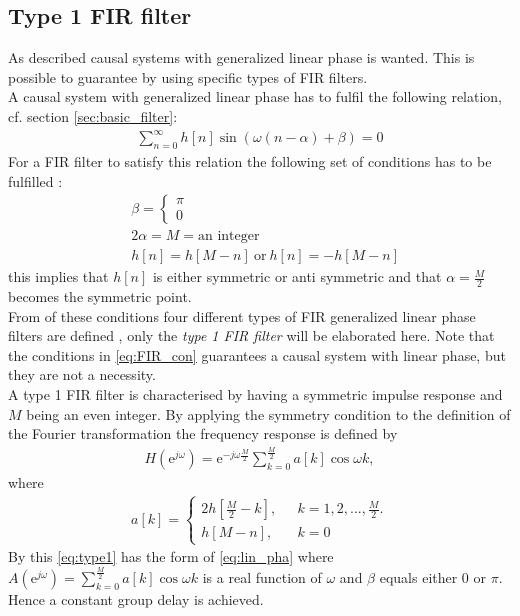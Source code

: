 \subsection{Type 1 FIR filter}
As described causal systems with generalized linear phase is wanted. This is possible to guarantee by using specific types of FIR filters.\\
A causal system with generalized linear phase has to fulfil the following relation, cf. section \ref{sec:basic_filter}:
\begin{align}
\sum_{n=0}^{\infty}h[n]\sin\left(\omega \left(n-\alpha \right) + \beta \right) = 0
\end{align}
For a FIR filter to satisfy this relation the following set of conditions has to be fulfilled \cite{DTSP, p.342}:
\begin{align} \label{eq:FIR_con}
&\beta = \left\{ \begin{matrix} 
\pi  \\
0 
\end{matrix}\right. \nonumber  \\ 
&2\alpha = M = \text{an integer} \\ 
&h[n]=h[M-n] \ \text{or} \ h[n]=-h[M-n] \nonumber  
\end{align} 
this implies that $h[n]$ is either symmetric or anti symmetric and that $\alpha = \frac{M}{2}$ becomes the symmetric point. \\
From of these conditions four different types of FIR generalized linear phase filters are defined \cite{DTSP, p. 343}, only the \textit{type 1 FIR filter} will be elaborated here. Note that the conditions in \eqref{eq:FIR_con} guarantees a causal system with linear phase, but they are not a necessity. \\
A type 1 FIR filter is characterised by having a symmetric impulse response and $M$ being an even integer. By applying the symmetry condition to the definition of the Fourier transformation the frequency response is defined by   
\begin{align}\label{eq:type1}
H(\text{e}^{j\omega})=\text{e}^{-j\omega \frac{M}{2}} \sum_{k=0}^{\frac{M}{2}} a[k]\cos \omega k,
\end{align}
where 
\begin{align}
a[k]= \left\{ \begin{matrix}
2h\left[ \frac{M}{2} - k \right], \ \ &\ k=1,2,... , \frac{M}{2}.   \\
h[M-n], \ \ &\ k = 0  
\end{matrix}\right.
\end{align}
By this \eqref{eq:type1} has the form of \eqref{eq:lin_pha} where $A(\text{e}^{j\omega})= \sum_{k=0}^{\frac{M}{2}} a[k]\cos \omega k$ is a real function of $\omega$ and $\beta$ equals either 0 or $\pi$. Hence a constant group delay is achieved.








   
 


 



